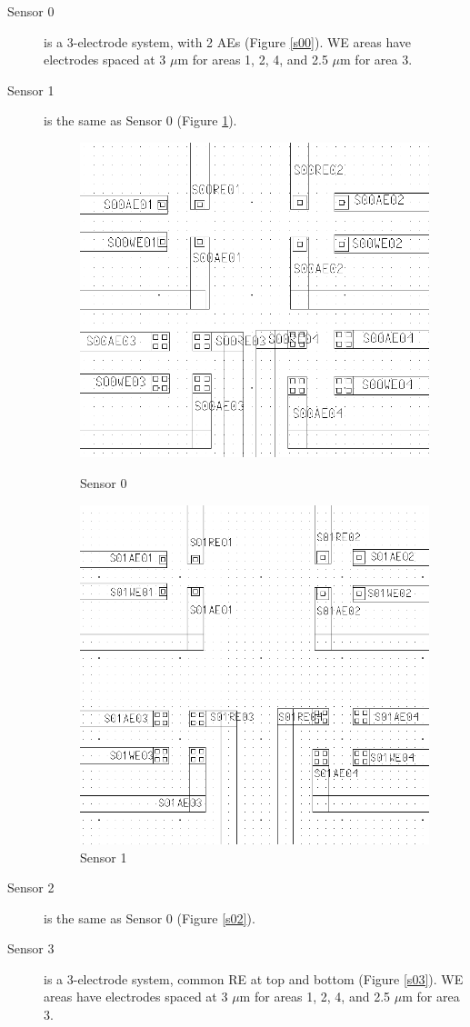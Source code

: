 \begin{description}

\item[Sensor 0] is a 3-electrode system, with 2 AEs (Figure \ref{s00}). WE areas have electrodes spaced at 3 $\mu \mathrm{m}$ for areas 1, 2, 4, and 2.5 $\mu \mathrm{m}$ for area 3.
\item[Sensor 1] is the same as Sensor 0 (Figure \ref{s01}).

\begin{figure}
	\begin{minipage}{0.5\linewidth}
		\centering
		\includegraphics[width=0.6\linewidth]{figures/s00.png}
		\caption{Sensor 0}
		\label{s00}
	\end{minipage}
	\begin{minipage}{0.5\linewidth}
		\centering
		\includegraphics[width=0.6\linewidth]{figures/s01.png}
		\caption{Sensor 1}
		\label{s01}
	\end{minipage}
\end{figure}

\item[Sensor 2] is the same as Sensor 0 (Figure \ref{s02}).
\item[Sensor 3] is a 3-electrode system, common RE at top and bottom (Figure \ref{s03}). WE areas have electrodes spaced at 3 $\mu \mathrm{m}$ for areas 1, 2, 4, and 2.5 $\mu \mathrm{m}$ for area 3.


\end{description}
